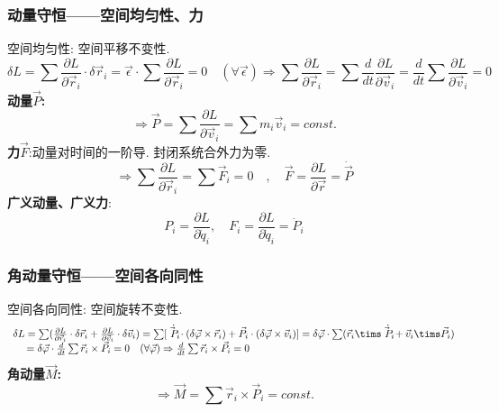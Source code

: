 \documentclass{article}
\begin{document}
\subsubsection{动量守恒——空间均匀性、力}
空间均匀性: 空间平移不变性.\\
$$\delta L = \sum \frac{\partial L}{\partial \vec r_i}\cdot \delta \vec r_i = \vec \epsilon \cdot \sum \frac{\partial L}{\partial \vec r_i} = 0\quad(\forall \vec \epsilon)
\Rightarrow \sum \frac{\partial L}{\partial \vec r_i} = \sum \frac{d}{dt} \frac{\partial L}{\partial \vec v_i} = \frac{d}{dt} \sum \frac{\partial L}{\partial \vec v_i} = 0$$
\textbf{动量$\vec P$: }
$$\Rightarrow \vec P = \sum \frac{\partial L}{\partial \vec v_i} = \sum m_i \vec v_i = const.$$
\textbf{力$\vec F$}:动量对时间的一阶导. \quad 封闭系统合外力为零.
$$\Rightarrow \sum \frac{\partial L}{\partial \vec r_i} = \sum \vec F_i = 0 \quad , \quad \vec F = \frac{\partial L}{\partial \vec r} = \dot{ \vec P }$$
\textbf{广义动量、广义力}:
$$P_i = \frac{\partial L}{\partial \dot q_i},\quad F_i = \frac{\partial L}{\partial \dot q_i} = \dot P_i$$


\subsubsection{角动量守恒——空间各向同性}
空间各向同性: 空间旋转不变性.
\begin{displaymath}
\begin{array}{ll}
\delta L = \sum (\frac{\partial L}{\partial \vec r_i} \cdot \delta \vec r_i + \frac{\partial L}{\partial \vec v_i} \cdot \delta \vec v_i) = \sum [\dot{\vec P_i} \cdot (\delta \vec \varphi \times \vec r_i) + \vec P_i \cdot ( \delta \vec \varphi \times \vec v_i )]
 = \delta \vec \varphi \cdot \sum (\vec r_i \tims \dot{\vec P_i} + \vec v_i \tims \vec P_i) \\
 \quad\  = \delta \vec \varphi \cdot \frac{d}{dt} \sum \vec r_i \times \vec P_i = 0\quad(\forall \vec \varphi) \Rightarrow \frac{d}{dt}\sum \vec r_i \times \vec P_i = 0
\end{array}
\end{displaymath}
\textbf{角动量$\vec M$: }
$$\Rightarrow \vec M = \sum \vec r_i \times \vec P_i = const.$$
\end{document}
